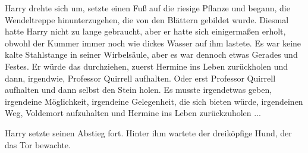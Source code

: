 Harry drehte sich um, setzte einen Fuß auf die riesige Pflanze und begann, die
Wendeltreppe hinunterzugehen, die von den Blättern gebildet wurde. Diesmal hatte
Harry nicht zu lange gebraucht, aber er hatte sich einigermaßen erholt, obwohl
der Kummer immer noch wie dickes Wasser auf ihm lastete. Es war keine kalte
Stahlstange in seiner Wirbelsäule, aber es war dennoch etwas Gerades und Festes.
Er würde das durchziehen, zuerst Hermine ins Leben zurückholen und dann,
irgendwie, Professor Quirrell aufhalten. Oder erst Professor Quirrell aufhalten
und dann selbst den Stein holen. Es musste irgendetwas geben, irgendeine
Möglichkeit, irgendeine Gelegenheit, die sich bieten würde, irgendeinen Weg,
Voldemort aufzuhalten und Hermine ins Leben zurückzuholen ...

Harry setzte seinen Abstieg fort. Hinter ihm wartete der dreiköpfige Hund, der
das Tor bewachte.

